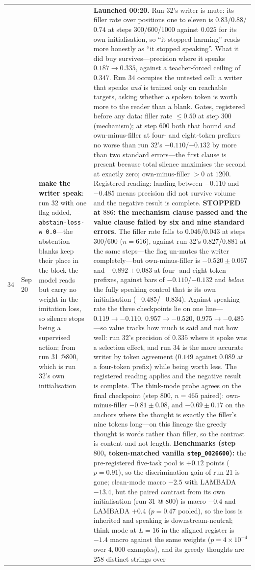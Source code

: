 \documentclass{article} %
\begin{document}
{\begin{longtable}{@{}llp{3.6cm}p{5.6cm}@{}}
34 & Sep 20 & \textbf{make the writer speak}: run 32 with one flag added, \texttt{-{}-abstain-loss-w 0.0}---the abstention blanks keep their place in the block the model reads but carry no weight in the imitation loss, so silence stops being a supervised action; from run 31 @800, which is run 32's own initialisation & \textbf{Launched 00:20.} Run 32's writer is mute: its filler rate over positions one to eleven is $0.83$/$0.88$/$0.74$ at steps $300$/$600$/$1000$ against $0.025$ for its own initialisation, so ``it stopped harming'' reads more honestly as ``it stopped speaking''. What it did buy survives---precision where it speaks $0.187 \to 0.335$, against a teacher-forced ceiling of $0.347$. Run 34 occupies the untested cell: a writer that speaks \emph{and} is trained only on reachable targets, asking whether a spoken token is worth more to the reader than a blank. Gates, registered before any data: filler rate $\le 0.50$ at step $300$ (mechanism); at step $600$ both that bound \emph{and} own-minus-filler at four- and eight-token prefixes no worse than run 32's $-0.110$/$-0.132$ by more than two standard errors---the first clause is present because total silence maximises the second at exactly zero; own-minus-filler $>0$ at $1200$. Registered reading: landing between $-0.110$ and $-0.485$ means precision did not survive volume and the negative result is complete. \textbf{STOPPED at $886$: the mechanism clause passed and the value clause failed by six and nine standard errors.} The filler rate falls to $0.046$/$0.043$ at steps $300$/$600$ ($n{=}616$), against run 32's $0.827$/$0.881$ at the same steps---the flag un-mutes the writer completely---but own-minus-filler is $-0.520 \pm 0.067$ and $-0.892 \pm 0.083$ at four- and eight-token prefixes, against bars of $-0.110$/$-0.132$ and \emph{below} the fully speaking control that is its own initialisation ($-0.485$/$-0.834$). Against speaking rate the three checkpoints lie on one line---$0.119 \to -0.110$, $0.957 \to -0.520$, $0.975 \to -0.485$---so value tracks how much is said and not how well: run 32's precision of $0.335$ where it spoke was a selection effect, and run 34 is the more accurate writer by token agreement ($0.149$ against $0.089$ at a four-token prefix) while being worth less. The registered reading applies and the negative result is complete. The think-mode probe agrees on the final checkpoint (step $800$, $n{=}465$ paired): own-minus-filler $-0.81 \pm 0.08$, and $-0.69 \pm 0.17$ on the anchors where the thought is exactly the filler's nine tokens long---on this lineage the greedy thought is words rather than filler, so the contrast is content and not length. \textbf{Benchmarks (step $800$, token-matched vanilla \texttt{step\_0026600}):} the pre-registered five-task pool is $+0.12$ points ($p = 0.91$), so the discrimination gain of run 21 is gone; clean-mode macro $-2.5$ with LAMBADA $-13.4$, but the paired contrast from its own initialisation (run 31 @ $800$) is macro $-0.4$ and LAMBADA $+0.4$ ($p = 0.47$ pooled), so the loss is inherited and speaking is downstream-neutral; think mode at $L{=}16$ in the aligned register is $-1.4$ macro against the same weights ($p = 4\times10^{-4}$ over $4{,}000$ examples), and its greedy thoughts are $258$ distinct strings over 
\end{longtable}}
\end{document}

